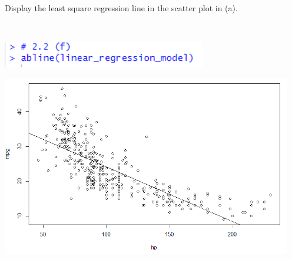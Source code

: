 Display the least square regression line in the scatter plot in (a).

\soln* $ $

\nl \includegraphics*[width=3.5in]{img/2_2f_code.PNG}

\nl \includegraphics*[width=5in]{img/2_2f_plot.PNG}